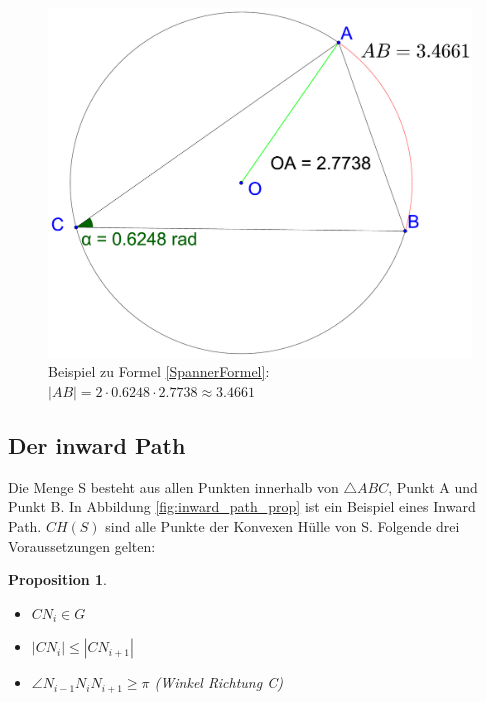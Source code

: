 \documentclass[a4paper,twoside]{IEEEtran}
\newtheorem{inwardPathProposition}{Proposition}
\begin{document}
\begin{figure}[h!]
\centering
\includegraphics[width=1\linewidth]{bogen_gleich_winkel_mal_strecke.eps}
\caption{Beispiel zu Formel \ref{SpannerFormel}: $|AB| = 2\cdot 0.6248 \cdot 2.7738 \approx 3.4661 $} %
\label{fig:winkel_mal_strecke}
\end{figure}








\subsection{Der inward Path}
Die Menge S besteht aus allen Punkten innerhalb von $\triangle {ABC} $, Punkt A und Punkt B.
In Abbildung \ref{fig:inward_path_prop} ist ein Beispiel eines Inward Path.
$CH(S) $ sind alle Punkte der Konvexen Hülle von S. %
Folgende drei Voraussetzungen gelten:
\begin{inwardPathProposition}
\begin{itemize} %
	\item $CN_i \in G$
	\item $|CN_i| \leq |CN_{i+1}| $
	\item $\angle{N_{i-1}N_iN_{i+1}} \geq \pi $ (Winkel Richtung C)
\end{itemize} 
\end{inwardPathProposition}
\end{document}
